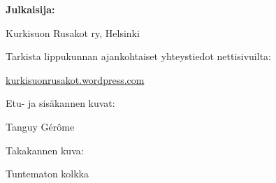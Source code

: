 \documentclass[10pt,finnish,a5paper]{scrartcl}
\begin{document}
\medskip

\noindent\textbf{Julkaisija:}

Kurkisuon Rusakot ry, Helsinki

\medskip

\noindent Tarkista lippukunnan ajankohtaiset yhteystiedot nettisivuilta:

\href{https://kurkisuonrusakot.wordpress.com/}{kurkisuonrusakot.wordpress.com}

\medskip

\noindent Etu- ja sisäkannen kuvat:

Tanguy Gérôme

\noindent Takakannen kuva:

Tuntematon kolkka

\vspace{0.64cm}

\tableofcontents















% 




\end{document}
